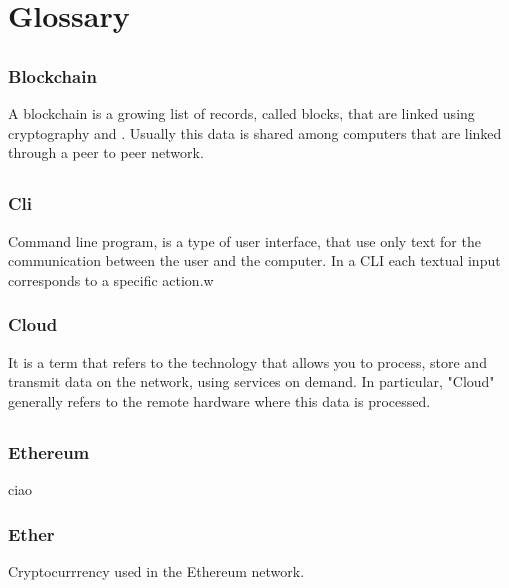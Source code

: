 \section{Glossary}

	\subsection*{}
		\subsubsection*{Blockchain}
			A blockchain is a growing list of records, called blocks, that are linked using cryptography and . Usually this data is shared among computers that are linked through a peer to peer network. 

	\subsection*{}
		\subsubsection*{Cli}
			Command line program, is a type of user interface, that use only text for the communication between the user and the computer. In a CLI each textual input corresponds to a specific action.w			
		
		\subsubsection*{Cloud}
			It is a term that refers to the technology that allows you to process, store and transmit data on the network, using services on demand. In particular, "Cloud" generally refers to the remote hardware where this data is processed.

	\subsection*{}
		\subsubsection*{Ethereum}
			ciao
		\subsubsection*{Ether}
			Cryptocurrrency used in the Ethereum network. 
	
	\subsection*{}
